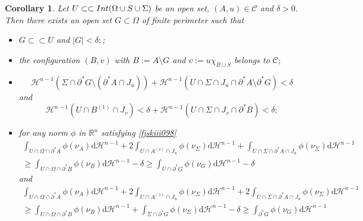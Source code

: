 \documentclass[reqno]{amsart}
\numberwithin{equation}{section}
\theoremstyle{plain}
\newtheorem{corollary}[theorem]{Corollary}
\theoremstyle{definition}
\newcommand{\R}{\mathbb{R}}
\newcommand{\cH}{\mathcal{H}}
\newcommand{\p}{\partial}
\renewcommand{\d}{\mathrm{d}}
\newcommand{\strictlyincluded}{\subset\subset}
\newcommand{\admissible}{\mathcal{C}}
\newcommand{\substrate}{S}
\newcommand{\Ins}[1]{{\rm Int}{(#1\cup \substrate\cup \Sigma)}}
\begin{document}
\begin{corollary}\label{cor:functions_with_cracks_Sigma}
Let $U\strictlyincluded \Ins{\Omega}$ be an open set, $(A,u)\in\admissible$ and $\delta>0.$ Then there exists an open set $G\subset\Omega$ of finite perimeter such that  
\begin{itemize}[left=15pt]
 \item[\rm (i)] $G\strictlyincluded U$ and $|G|<\delta;$; 

 \item[\rm (ii)] the configuration $(B,v)$ with $B:=A\setminus G$ and $v:=u\chi_{B\cup S}$ belongs to $\admissible;$

 \item[\rm (iii)] 
 $$
 \cH^{n-1}(\Sigma\cap \p^*G\setminus (\p^*A\cap J_u)) + \cH^{n-1}(U\cap \Sigma\cap J_u\cap \p^*A\setminus \p^*G) < \delta
 $$ 
 and 
 $$
 \cH^{n-1}(U\cap B^{(1)}\cap J_v)<\delta + 
 \cH^{n-1}(U\cap \Sigma\cap J_v\cap \p^*B) < \delta;
 $$
 
 \item[\rm (iv)] for any norm $\phi$ in $\R^n$ satisfying \eqref{fjskiii098} 
 \begin{multline}
\int_{U\cap\Omega\cap \p^*A} \phi(\nu_A)\d\cH^{n-1} + 2\int_{U\cap A^{(1)}\cap J_u} \phi(\nu_\Sigma)\d\cH^{n-1}  +
\int_{U\cap \Sigma\cap\p^*A\cap J_u}  \phi(\nu_\Sigma)\d\cH^{n-1} \\
  \ge  \int_{U\cap\Omega\cap \p^*B} \phi(\nu_B)\d\cH^{n-1} -\delta 
 \ge \int_{U\cap\p^*G} \phi(\nu_G)\d\cH^{n-1} -\delta  
  \label{matmat343}
 \end{multline}
 and 
 \begin{multline}
 \int_{U\cap\Omega\cap \p^*A} \phi(\nu_A)\d\cH^{n-1} +  2 
\int_{U\cap A^{(1)}\cap J_u} \phi(\nu_\Sigma)\d\cH^{n-1}   +   
 2 \int_{U\cap \Sigma\cap\p^*A\cap J_u} \phi(\nu_\Sigma)\d\cH^{n-1} \\
  \ge \int_{U\cap\Omega\cap \p^*B} \phi(\nu_B)\d\cH^{n-1} 
 +\int_{\Sigma\cap \p^*G} \phi(\nu_\Sigma)\d\cH^{n-1} -\delta 
 \ge \int_{\p^*G} \phi(\nu_G)\d\cH^{n-1} 
 \label{matmat347}
 \end{multline}
\end{itemize}

\end{corollary}
\end{document}
